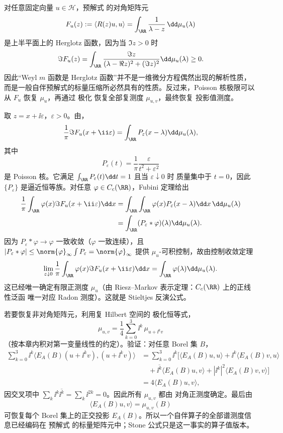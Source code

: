对任意固定向量 $u\in\mathcal H$，预解式 的对角矩阵元
\begin{equation}\label{eq:math-sl-vector-resolvent-herglotz}
 F_u(z):=\langle R(z)u,u\rangle
 =\int_{\RR}\frac{1}{\lambda-z}\,\dd\mu_u(\lambda)
\end{equation}
是上半平面上的 Herglotz 函数，因为当 $\Im z>0$ 时
\[
 \Im F_u(z)
 =\int_{\RR}\frac{\Im z}{(\lambda-\Re z)^2+(\Im z)^2}\dd\mu_u(\lambda)\ge0.
\]
因此“Weyl $m$ 函数是 Herglotz 函数”并不是一维微分方程偶然出现的解析性质，而是一般自伴预解式的标量压缩所必然具有的性质。反过来，Poisson 核极限可以从 $F_u$ 恢复 $\mu_u$，再通过 极化 恢复全部复测度 $\mu_{u,v}$，最终恢复 投影值测度。

取 $z=x+\ii\varepsilon$，$\varepsilon>0$。由，
\[
 \frac1\pi\Im F_u(x+\ii\varepsilon)
 =\int_{\RR}P_\varepsilon(x-\lambda)\dd\mu_u(\lambda),
\]
其中
\[
 P_\varepsilon(t)=\frac1\pi\frac{\varepsilon}{t^2+\varepsilon^2}
\]
是 Poisson 核。它满足 $\int_\RR P_\varepsilon(t)\dd t=1$ 且当 $\varepsilon\downarrow0$ 时
质量集中于 $t=0$，因此 $\{P_\varepsilon\}$ 是逼近恒等族。对任意
$\varphi\in C_c(\RR)$，Fubini 定理给出
\[
 \begin{aligned}
 \frac1\pi\int_{\RR}\varphi(x)\Im F_u(x+\ii\varepsilon)\dd x
 &=\int_{\RR}\int_{\RR}\varphi(x)P_\varepsilon(x-\lambda)\dd x\,\dd\mu_u(\lambda)\\
 &=\int_{\RR}(P_\varepsilon*\varphi)(\lambda)\dd\mu_u(\lambda).
 \end{aligned}
\]
因为 $P_\varepsilon*\varphi\to\varphi$ 一致收敛（$\varphi$ 一致连续），且
$|P_\varepsilon*\varphi|\le\norm{\varphi}_\infty\int P_\varepsilon=\norm{\varphi}_\infty$
提供 $\mu_u$-可积控制，故由控制收敛定理
\begin{equation*}\lim_{\varepsilon\downarrow0}
 \frac1\pi\int_{\RR}\varphi(x)\Im F_u(x+\ii\varepsilon)\dd x
 =\int_{\RR}\varphi(\lambda)\dd\mu_u(\lambda).
\end{equation*}
这已经唯一确定有限正测度 $\mu_u$（由 Riesz--Markov 表示定理：$C_c(\RR)$ 上的正线性泛函
唯一对应 Radon 测度）。这就是 Stieltjes 反演公式。

若要恢复非对角矩阵元，利用复 Hilbert 空间的 极化恒等式，
\[
 \mu_{u,v}
 =\frac14\sum_{k=0}^3\ii^k\,
 \mu_{u+\ii^k v}
\]
（按本章内积对第一变量线性的约定）。验证：对任意 Borel 集 $B$，
\begin{align*}
 \sum_{k=0}^3\ii^k\langle E_A(B)(u+\ii^k v),(u+\ii^k v)\rangle
 &=\sum_{k=0}^3\ii^k\bigl[
 \langle E_A(B)u,u\rangle+\ii^k\langle E_A(B)v,u\rangle\\
 &\quad+\overline{\ii^k}\langle E_A(B)u,v\rangle
 +|\ii^k|^2\langle E_A(B)v,v\rangle\bigr]\\
 &=4\langle E_A(B)u,v\rangle,
 \end{align*}
因交叉项中 $\sum_k\ii^k\overline{\ii^k}=\sum_k\ii^{2k}=0$。因此所有 $\mu_{u,v}$ 都由
对角正测度确定。最后由
\[
 \langle E_A(B)u,v\rangle=\mu_{u,v}(B)
\]
可恢复每个 Borel 集上的正交投影 $E_A(B)$。所以一个自伴算子的全部谱测度信息已经编码在
预解式 的标量矩阵元中；Stone 公式只是这一事实的算子值版本。

